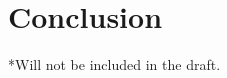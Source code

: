 \documentclass[fina_report_innit.tex]{subfiles}
\begin{document}
\section{Conclusion}
*Will not be included in the draft.
\end{document}
